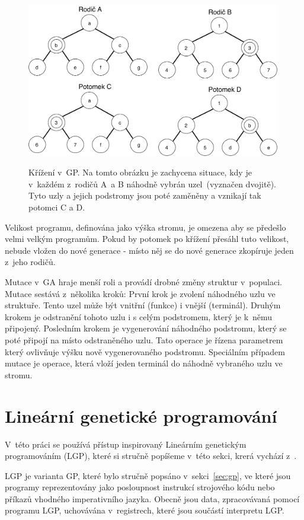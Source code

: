 \begin{figure}[h]
    \centering
    {\includegraphics[width=30em]{obrazky/gp_krizeni.pdf}}
    \caption[Křížení v~GP]{
    Křížení v~GP.
    Na tomto obrázku je zachycena situace, kdy je v~každém z~rodičů A~a B náhodně vybrán uzel~(vyznačen dvojitě).
    Tyto uzly a jejich podstromy jsou poté zaměněny a vznikají tak potomci C a D.
    }
    \label{fig:GP_krizeni}
\end{figure}

Velikost programu, definována jako výška stromu, je omezena aby se předešlo velmi velkým programům.
Pokud by potomek po křížení přesáhl tuto velikost, nebude vložen do nové generace - místo něj se do nové generace zkopíruje jeden z~jeho rodičů.

Mutace v~GA hraje menší roli a provádí drobné změny struktur v~populaci.
Mutace sestává z~několika kroků:
První krok je zvolení náhodného uzlu ve struktuře.
Tento uzel může být vnitřní (funkce) i vnější (terminál).
Druhým krokem je odstranění tohoto uzlu i s celým podstromem, který je k~němu připojený.
Posledním krokem je vygenerování náhodného podstromu, který se poté připojí na místo odstraněného uzlu.
Tato operace je řízena parametrem který ovlivňuje výšku nově vygenerovaného podstromu.
Speciálním případem mutace je operace, která vloží jeden terminál do náhodně vybraného uzlu ve stromu.

\section{Lineární genetické programování}
\label{sec:lgp}

V~této práci se používá přístup inspirovaný Lineárním genetickým programováním (LGP), které si stručně popíšeme v~této sekci, krerá vychází z~\cite{Brameier2010}.

LGP je varianta GP, které bylo stručně popsáno v~sekci~\ref{sec:gp}, ve které jsou programy reprezentovány jako posloupnost instrukcí strojového kódu nebo příkazů vhodného imperativního jazyka.
Obecně jsou data, zpracovávaná pomocí programu LGP, uchovávána v~registrech, které jsou součástí interpretu LGP.

